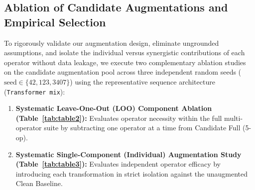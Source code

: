 \documentclass[runningheads]{llncs}
\begin{document}
\subsection{Ablation of Candidate Augmentations and Empirical Selection}\label{sec:exp_aug}
To rigorously validate our augmentation design, eliminate ungrounded assumptions, and isolate the individual versus synergistic contributions of each operator without data leakage, we execute two complementary ablation studies on the candidate augmentation pool across three independent random seeds ($\text{seed} \in \{42, 123, 3407\}$) using the representative sequence architecture (\texttt{Transformer mix}):
\begin{enumerate}
    \item \textbf{Systematic Leave-One-Out (LOO) Component Ablation (Table~\ref{tab:table2}):} Evaluates operator necessity within the full multi-operator suite by subtracting one operator at a time from Candidate Full (5-op).
    \item \textbf{Systematic Single-Component (Individual) Augmentation Study (Table~\ref{tab:table3}):} Evaluates independent operator efficacy by introducing each transformation in strict isolation against the unaugmented Clean Baseline.
\end{enumerate}
\end{document}
